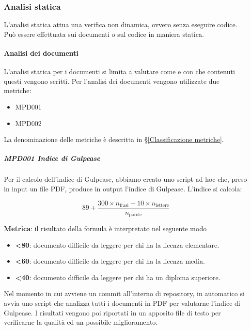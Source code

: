 		\subsubsection{Analisi statica}\label{AnalisiStatica}
		L'analisi statica attua una verifica non dinamica, ovvero senza eseguire codice.
		Può essere effettuata sui documenti o sul codice in maniera statica.


			\paragraph{Analisi dei documenti}\label{ProcessiSupportoMetriche}
			L'analisi statica per i documenti si limita a valutare come e con che contenuti questi vengono scritti.
			Per l'analisi dei documenti vengono utilizzate due metriche:

			\begin{itemize}
				\item MPD001
				\item MPD002
			\end{itemize}

			La denominazione delle metriche è descritta in \S\ref{Classificazione metriche}.

			\subparagraph{MPD001 Indice di Gulpease}\label{AnalisiStatica:Gulpease}
			Per il calcolo dell'indice di Gulpease, abbiamo creato uno script ad hoc che, preso in input un file PDF, produce in output l'indice di Gulpease.
			L'indice si calcola:

			\[89+\dfrac{300\times n_{\text{frasi}}-10\times n_{\text{lettere}}}{n_{\text{parole}}}\]

			\textbf{Metrica}: il risultato della formula è interpretato nel seguente modo

			\begin{itemize}
				\item \textbf{<80}: documento  difficile da leggere per chi ha la licenza elementare.
				\item \textbf{<60}: documento  difficile da leggere per chi ha la licenza media.
				\item \textbf{<40}: documento difficile da leggere per chi ha un diploma superiore.
			\end{itemize}

			Nel momento in cui avviene un commit all'interno di repository, in automatico si avvia uno script che analizza tutti i documenti in PDF per valutarne
			l'indice di Gulpease. I risultati vengono poi riportati in un apposito file di testo per verificarne la qualità ed un possibile miglioramento.

